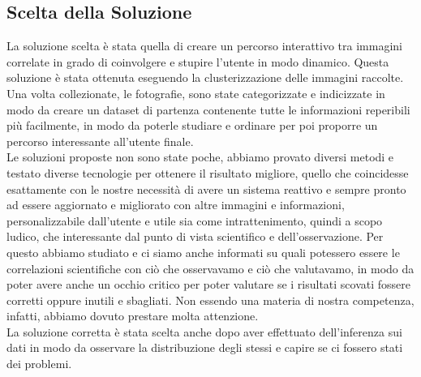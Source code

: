 \documentclass[12pt,a4paper,twoside]{article}
\begin{document}
\subsection{Scelta della Soluzione}
La soluzione scelta è stata quella di creare un percorso interattivo tra immagini correlate in 
grado di coinvolgere e stupire l'utente in modo dinamico. Questa soluzione è stata ottenuta 
eseguendo la clusterizzazione delle immagini raccolte.\\
Una volta collezionate, le fotografie, sono state categorizzate e indicizzate in modo da creare 
un dataset di partenza contenente tutte le informazioni reperibili più facilmente, in modo da 
poterle studiare e ordinare per poi proporre un percorso interessante all'utente finale.\\
Le soluzioni proposte non sono state poche, abbiamo provato diversi metodi e testato diverse 
tecnologie per ottenere il risultato migliore, quello che coincidesse esattamente con le nostre 
necessità di avere un sistema reattivo e sempre pronto ad essere aggiornato e migliorato con 
altre immagini e informazioni, personalizzabile dall'utente e utile sia come intrattenimento, 
quindi a scopo ludico, che interessante dal punto di vista scientifico e dell'osservazione. Per 
questo abbiamo studiato e ci siamo anche informati su quali potessero essere le correlazioni 
scientifiche con ciò che osservavamo e ciò che valutavamo, in modo da poter avere anche un 
occhio critico per poter valutare se i risultati scovati fossere corretti oppure inutili e 
sbagliati. Non essendo una materia di nostra competenza, infatti, abbiamo dovuto prestare molta 
attenzione.\\
La soluzione corretta è stata scelta anche dopo aver effettuato dell'inferenza sui dati in modo 
da osservare la distribuzione degli stessi e capire se ci fossero stati dei problemi. 
\end{document}
